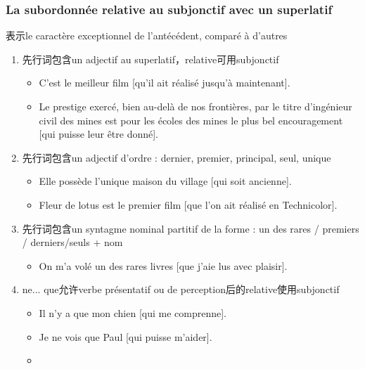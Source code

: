 \documentclass[UTF8]{report}
\begin{document}
\subsubsection{La subordonnée relative au subjonctif avec un superlatif}
表示le caractère exceptionnel de l’antécédent, comparé à d’autres
\begin{enumerate}
    \item 先行词包含un adjectif au superlatif，relative可用subjonctif
    \begin{itemize}
        \item C’est le meilleur film [qu’il ait réalisé jusqu’à maintenant].
        \item Le prestige exercé, bien au-delà de nos frontières, par le titre d’ingénieur civil des mines est pour les écoles des mines le plus bel encouragement [qui puisse leur être donné].
    \end{itemize}
    \item 先行词包含un adjectif d’ordre : dernier, premier, principal, seul, unique
    \begin{itemize}
        \item Elle possède l’unique maison du village [qui soit ancienne].
        \item Fleur de lotus est le premier film [que l’on ait réalisé en Technicolor].
    \end{itemize}
    \item 先行词包含un syntagme nominal partitif de la forme : un des rares / premiers / derniers/seuls + nom
    \begin{itemize}
        \item On m’a volé un des rares livres [que j’aie lus avec plaisir].
    \end{itemize}
    \item ne... que允许verbe présentatif ou de perception后的relative使用subjonctif
    \begin{itemize}
        \item Il n’y a que mon chien [qui me comprenne].
        \item Je ne vois que Paul [qui puisse m’aider].
        \item 
    \end{itemize}
\end{enumerate}
\end{document}
